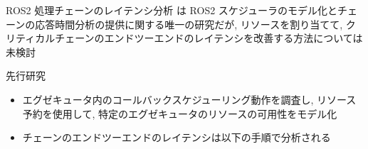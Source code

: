 {    \begin{frame}{ROS2 処理チェーンのレイテンシ分析}
        \cite{casini2019response} は ROS2 スケジューラのモデル化とチェーンの応答時間分析の提供に関する唯一の研究だが, リソースを割り当てて, クリティカルチェーンのエンドツーエンドのレイテンシを改善する方法については未検討
        \begin{block}{先行研究 \cite{casini2019response}}
            \setlength{\linewidth}{0.98\columnwidth}
            \setlength{\wideitemsep}{0.8\itemsep}
            {\footnotesize
                \begin{itemize}
                    \item エグゼキュータ内のコールバックスケジューリング動作を調査し, リソース予約を使用して, 特定のエグゼキュータのリソースの可用性をモデル化
                    \item チェーンのエンドツーエンドのレイテンシは以下の手順で分析される
                \end{itemize}
            }
        \end{block}
    \end{frame}
}
